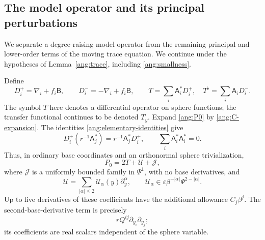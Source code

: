 \subsection{The model operator and its principal perturbations}

We separate a degree-raising model operator from the remaining
principal and lower-order terms of the moving trace equation.  We continue under the hypotheses of
Lemma~\ref{ang:trace}, including \eqref{ang:smallness}.

Define
\begin{equation}\label{ang:T-definition}
 D_i^+=\nabla_i+f_i\mathsf B,\qquad D_i^-=-\nabla_i+f_i\mathsf B,
 \qquad
 T=\sum_i \mathsf A_i^*D_i^+,\quad T^\flat=\sum_i \mathsf A_iD_i^-.
\end{equation}
The symbol $T$ here denotes a differential operator on sphere functions;
the transfer functional continues to be denoted $T_y$.
Expand \eqref{ang:P0} by
\eqref{ang:C-expansion}.  The identities
\eqref{ang:elementary-identities} give
\[
 D_i^+(r^{-1}\mathsf A_j^*)=r^{-1}\mathsf A_j^*D_i^+,
 \qquad \sum_i\mathsf A_i^*\mathsf A_i^*=0.
\]
Thus, in ordinary base coordinates and an orthonormal sphere
trivialization,
\begin{equation}\label{ang:P-decomposition}
 P_0=2T+\mathcal U+\mathcal J,
\end{equation}
where $\mathcal J$ is a uniformly bounded family in $\Psi^1$, with no base
derivatives, and
\begin{equation}\label{ang:U-bounds}
 \mathcal U=\sum_{|\alpha|\le2}\mathcal U_\alpha(y)\partial_y^\alpha,
 \qquad \mathcal U_\alpha\in\varepsilon\beta^{-|\alpha|}
                               \Psi^{2-|\alpha|}.
\end{equation}
Up to five derivatives of these coefficients have the additional
allowance $C_j\beta^j$.  The second-base-derivative term is precisely
\begin{equation}\label{ang:real-principal-part}
 rQ^{ij}\partial_{y_i}\partial_{y_j};
\end{equation}
its coefficients are real scalars independent of the sphere variable.

